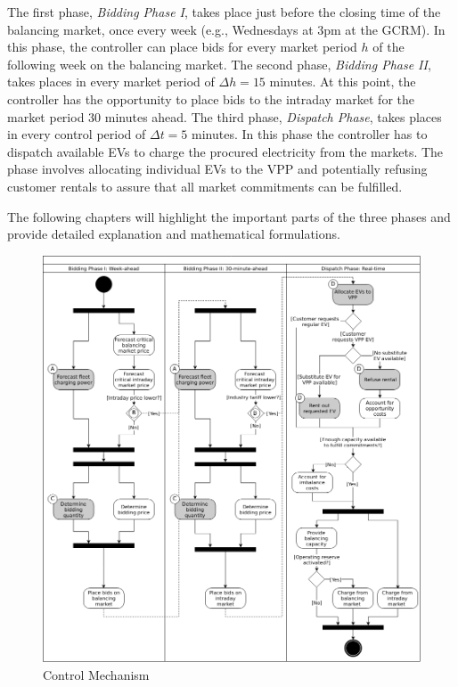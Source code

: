 \documentclass[a4paper, 12pt]{article}
\begin{document}
The first phase, \emph{Bidding Phase I}, takes place just before the closing time of
the balancing market, once every week (e.g., Wednesdays at 3pm at the GCRM). In
this phase, the controller can place bids for every market period \(h\) of the
following week on the balancing market. The second phase, \emph{Bidding Phase II},
takes places in every market period of \(\Delta{h}\!=\!15\) minutes. At this
point, the controller has the opportunity to place bids to the intraday market
for the market period 30 minutes ahead. The third phase, \emph{Dispatch Phase}, takes
places in every control period of \(\Delta{t}\!=\!5\) minutes. In this phase the
controller has to dispatch available EVs to charge the procured electricity from
the markets. The phase involves allocating individual EVs to the VPP and
potentially refusing customer rentals to assure that all market commitments can
be fulfilled.

The following chapters will highlight the important parts of the three phases
and provide detailed explanation and mathematical formulations.

\begin{figure}[p]
\centering
\includegraphics[width=1.05\linewidth]{fig/control-mechanism.png}
\caption[Control Mechanism]{Control Mechanism \label{fig-control-mechanism}}
\end{figure}
\end{document}
